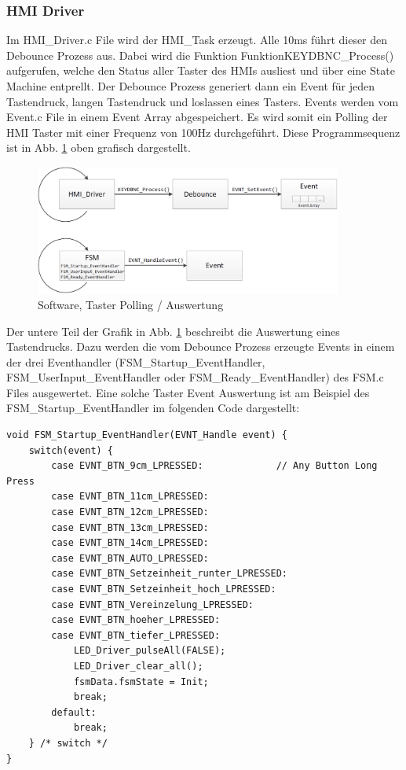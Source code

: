 \subsubsection{HMI Driver}
Im HMI\_Driver.c File wird der HMI\_Task erzeugt. Alle 10ms führt dieser den Debounce Prozess aus. Dabei wird die Funktion FunktionKEYDBNC\_Process() aufgerufen, welche den Status aller Taster des HMIs ausliest und über eine State Machine entprellt. Der Debounce Prozess generiert dann ein Event für jeden Tastendruck, langen Tastendruck und loslassen eines Tasters. Events werden vom Event.c File in einem Event Array abgespeichert. Es wird somit ein Polling der HMI Taster mit einer Frequenz von 100Hz durchgeführt. Diese Programmsequenz ist in Abb. \ref{fig:Taster_Polling} oben grafisch dargestellt.


\begin{figure}[H]
	\includegraphics[width=0.9\textwidth]{Illustrationen/6-Umsetzung/Taster_Polling.png}
	\caption{Software, Taster Polling / Auswertung}
	\label{fig:Taster_Polling}
\end{figure}

Der untere Teil der Grafik in Abb. \ref{fig:Taster_Polling} beschreibt die Auswertung eines Tastendrucks. Dazu werden die vom Debounce Prozess erzeugte Events in einem der drei Eventhandler (FSM\_Startup\_EventHandler, FSM\_UserInput\_EventHandler oder FSM\_Ready\_EventHandler) des FSM.c Files ausgewertet. Eine solche Taster Event Auswertung ist am Beispiel des FSM\_Startup\_EventHandler im folgenden Code dargestellt:

\begin{lstlisting}
void FSM_Startup_EventHandler(EVNT_Handle event) {
	switch(event) {
		case EVNT_BTN_9cm_LPRESSED:				// Any Button Long Press
		case EVNT_BTN_11cm_LPRESSED:
		case EVNT_BTN_12cm_LPRESSED:
		case EVNT_BTN_13cm_LPRESSED:
		case EVNT_BTN_14cm_LPRESSED:
		case EVNT_BTN_AUTO_LPRESSED:
		case EVNT_BTN_Setzeinheit_runter_LPRESSED:
		case EVNT_BTN_Setzeinheit_hoch_LPRESSED:
		case EVNT_BTN_Vereinzelung_LPRESSED:
		case EVNT_BTN_hoeher_LPRESSED:
		case EVNT_BTN_tiefer_LPRESSED:
			LED_Driver_pulseAll(FALSE);
			LED_Driver_clear_all();
			fsmData.fsmState = Init;
			break;
		default:
			break;
	} /* switch */
}
\end{lstlisting}

